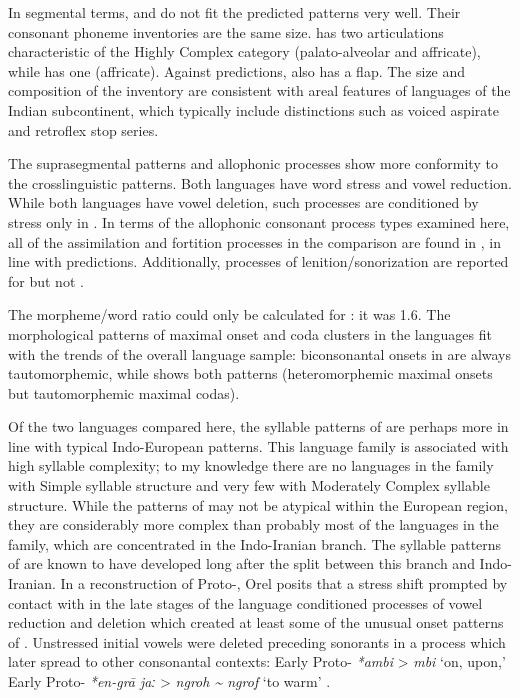   In segmental terms,  and  do not fit the predicted patterns very well. Their consonant phoneme inventories are the same size.  has two articulations characteristic of the Highly Complex category (palato-alveolar and affricate), while  has one (affricate). Against predictions,  also has a flap. The size and composition of the  inventory are consistent with areal features of languages of the Indian subcontinent, which typically include distinctions such as voiced aspirate and retroflex stop series.

  The suprasegmental patterns and allophonic processes show more conformity to the crosslinguistic patterns. Both languages have word stress and vowel reduction. While both languages have vowel deletion, such processes are conditioned by stress only in . In terms of the allophonic consonant process types examined here, all of the assimilation and fortition processes in the comparison are found in , in line with predictions. Additionally, processes of lenition/sonorization are reported for  but not .

  The morpheme/word ratio could only be calculated for : it was 1.6. The morphological patterns of maximal onset and coda clusters in the languages fit with the trends of the overall language sample: biconsonantal onsets in  are always tautomorphemic, while  shows both patterns (heteromorphemic maximal onsets but tautomorphemic maximal codas).

  Of the two languages compared here, the syllable patterns of  are perhaps more in line with typical Indo-European patterns. This language family is associated with high syllable complexity; to my knowledge there are no languages in the family with Simple syllable structure and very few with Moderately Complex syllable structure. While the patterns of  may not be atypical within the European region, they are considerably more complex than probably most of the languages in the family, which are concentrated in the Indo-Iranian branch. The syllable patterns of  are known to have developed long after the split between this branch and Indo-Iranian. In a reconstruction of Proto-, Orel posits that a stress shift prompted by contact with  in the late stages of the language conditioned processes of vowel reduction and deletion which created at least some of the unusual onset patterns of . Unstressed initial vowels were deleted preceding sonorants in a process which later spread to other consonantal contexts: Early Proto- \textit{*ambi} >  \textit{mbi} ‘on, upon,’ Early Proto- \textit{*en-gra\={} jaː} >  \textit{ngroh {\textasciitilde} ngrof} ‘to warm’ \citep[22]{Orel2000}.

